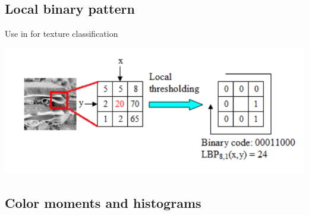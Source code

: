 \documentclass[aspectratio=169]{beamer}
\newenvironment{myframe}[1][t]{\begin{frame}[#1]{\secname}{\subsecname}}{\end{frame}}
\begin{document}
    \subsection{Local binary pattern}
    
    \begin{myframe}
        Use in \cite{Zong2010, Nguyen2014} for texture classification
        
        \includegraphics[scale=0.55]{../img/lbp}
    \end{myframe}
    
    \subsection{Color moments and histograms}
    
\end{document}
